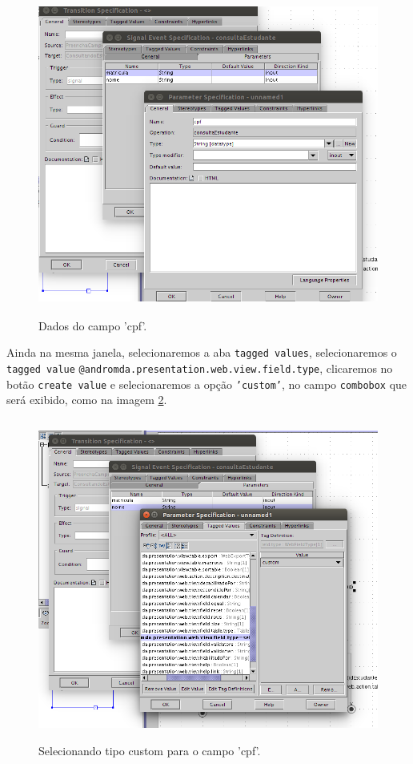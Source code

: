 \begin{figure}[H]
	\centering
	\includegraphics[width=350pt,height=300pt]{files/imgs/tutorial-mdarte-0033.png}
	\caption{Dados do campo 'cpf'.}
	\label{dados_campo_custom_cpf}
\end{figure}

Ainda na mesma janela, selecionaremos a aba \texttt{tagged values},
selecionaremos o \texttt{tagged value} 
\texttt{@andromda.presentation.web.view.field.type}, clicaremos no botão
\texttt{create value} e selecionaremos a opção \texttt{'custom'}, no campo
\texttt{combobox} que será exibido, como na imagem \ref{parametro_cpf_custom}.
\begin{figure}[H]
	\centering
	\includegraphics[width=350pt,height=300pt]{files/imgs/tutorial-mdarte-0034.png}
	\caption{Selecionando tipo custom para o campo 'cpf'.}
	\label{parametro_cpf_custom}
\end{figure}

